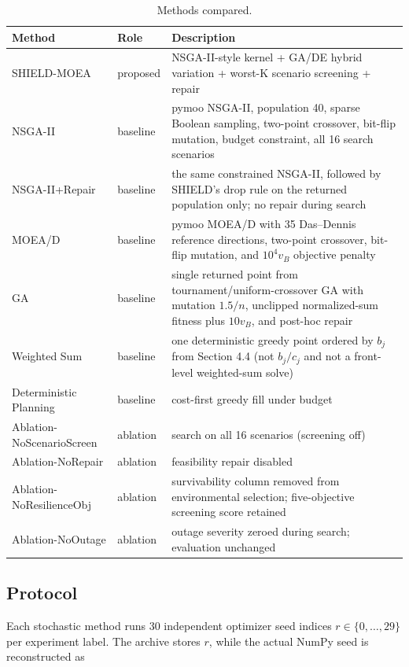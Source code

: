 \documentclass[energies,article,submit,moreauthors]{Definitions/mdpi}
\begin{document}
\begin{table}[t]
\centering
\scriptsize
\setlength{\tabcolsep}{3pt}
\caption{Methods compared.}\label{tab:2}
\begin{tabularx}{\textwidth}{@{}>{\raggedright\arraybackslash}X >{\raggedright\arraybackslash}X >{\raggedright\arraybackslash}X@{}}
\toprule
Method & Role & Description \\
\midrule
SHIELD-MOEA & proposed & NSGA-II-style kernel + GA/DE hybrid variation + worst-K scenario screening + repair \\
NSGA-II & baseline & pymoo NSGA-II, population 40, sparse Boolean sampling, two-point crossover, bit-flip mutation, budget constraint, all 16 search scenarios \\
NSGA-II+Repair & baseline & the same constrained NSGA-II, followed by SHIELD's drop rule on the returned population only; no repair during search \\
MOEA/D & baseline & pymoo MOEA/D with 35 Das--Dennis reference directions, two-point crossover, bit-flip mutation, and $10^4v_B$ objective penalty \\
GA & baseline & single returned point from tournament/uniform-crossover GA with mutation $1.5/n$, unclipped normalized-sum fitness plus $10v_B$, and post-hoc repair \\
Weighted Sum & baseline & one deterministic greedy point ordered by $b_j$ from Section 4.4 (not $b_j/c_j$ and not a front-level weighted-sum solve) \\
Deterministic Planning & baseline & cost-first greedy fill under budget \\
Ablation-NoScenarioScreen & ablation & search on all 16 scenarios (screening off) \\
Ablation-NoRepair & ablation & feasibility repair disabled \\
Ablation-NoResilienceObj & ablation & survivability column removed from environmental selection; five-objective screening score retained \\
Ablation-NoOutage & ablation & outage severity zeroed during search; evaluation unchanged \\
\bottomrule
\end{tabularx}
\end{table}

\subsection{Protocol}\label{protocol}

Each stochastic method runs 30 independent optimizer seed indices \(r\in\{0,\ldots,29\}\) per experiment label. The archive stores \(r\), while the actual NumPy seed is reconstructed as
\end{document}
